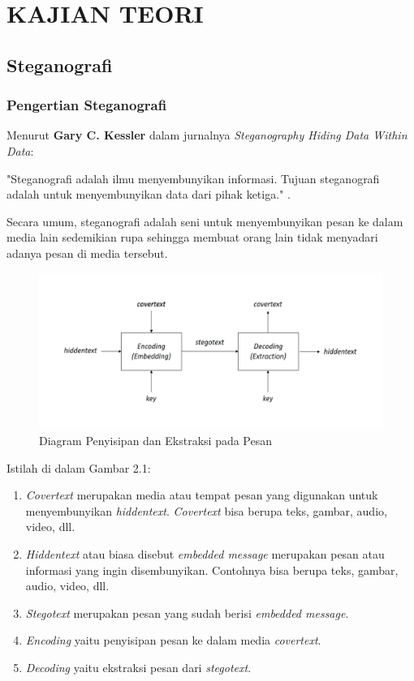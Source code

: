 
\chapter{KAJIAN TEORI}                

\section{Steganografi}
	\subsection{Pengertian Steganografi}
	Menurut \textbf{Gary C. Kessler} dalam jurnalnya \emph{Steganography Hiding Data Within Data}:
	
	"Steganografi adalah ilmu menyembunyikan informasi. Tujuan steganografi adalah untuk menyembunyikan data dari pihak ketiga." \cite{kessler}.
	
	Secara umum, steganografi adalah seni untuk menyembunyikan pesan ke dalam media lain sedemikian rupa sehingga membuat orang lain tidak menyadari adanya pesan di media tersebut.
	
	\begin{figure}[H]
		\centering
		\includegraphics[width=1\textwidth]{gambar/diagram_steganografi}
		\caption{Diagram Penyisipan dan Ekstraksi pada Pesan}
		\label{diagram_steganografi}
	\end{figure} 

	Istilah di dalam Gambar 2.1:
	\begin{enumerate}
		\item \emph{Covertext} merupakan media atau tempat pesan yang digunakan untuk menyembunyikan \emph{hiddentext}. \emph{Covertext} bisa berupa teks, gambar, audio, video, dll.
		\item \emph{Hiddentext}	atau biasa disebut \emph{embedded message} merupakan pesan atau informasi yang ingin disembunyikan. Contohnya bisa berupa teks, gambar, audio, video, dll.
		\item \emph{Stegotext} merupakan pesan yang sudah berisi \emph{embedded message}.
		\item \emph{Encoding} yaitu penyisipan pesan ke dalam media \emph{covertext}.
		\item \emph{Decoding} yaitu ekstraksi pesan dari \emph{stegotext}.
	\end{enumerate}

